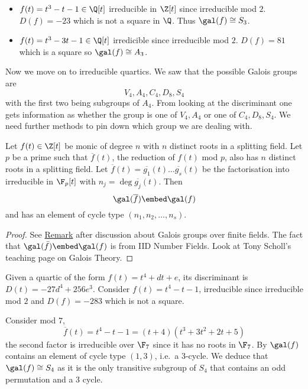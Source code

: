 \documentclass[a4paper]{article}
\newcommand*{\red}[1]{\overline{#1}}
\begin{document}
\begin{eg}\leavevmode
  \begin{itemize}
  \item \(f(t) = t^3 - t - 1 \in \Q[t]\) irreducible in \(\Z[t]\) since irreducible mod \(2\). \(D(f) = -23\) which is not a square in \(\Q\). Thus \(\gal(f) \cong S_3\).
  \item \(f(t) = t^3 - 3t - 1 \in \Q[t]\) irredicible since irreducible mod \(2\). \(D(f) = 81\) which is a square so \(\gal(f) \cong A_3\).
  \end{itemize}
\end{eg}

Now we move on to irreducible quartics. We saw that the possible Galois groups are
\[
  V_4, A_4, C_4, D_8, S_4
\]
with the first two being subgroups of \(A_4\). From looking at the discriminant one gets information as whether the group is one of \(V_4, A_4\) or one of \(C_4, D_8, S_4\). We need further methods to pin down which group we are dealing with.

\begin{theorem}
  \label{thm:mod p reduction}
  Let \(f(t) \in \Z[t]\) be monic of degree \(n\) with \(n\) distinct roots in a splitting field. Let \(p\) be a prime such that \(\red f(t)\), the reduction of \(f(t)\) mod \(p\), also has \(n\) distinct roots in a splitting field. Let \(\red f(t) = \red{g_1}(t) \dots \red{g_s}(t)\) be the factorisation into irreducible in \(\F_p[t]\) with \(n_j =  \deg \red{g_j}(t)\). Then
  \[
    \gal(\red f) \embed \gal(f)
  \]
  and has an element of cycle type \((n_1, n_2, \dots, n_s)\).
\end{theorem}

\begin{proof}
  See \hyperref[rmk:mod p reduction]{Remark} after discussion about Galois groups over finite fields. The fact that \(\gal(\bar f) \embed \gal(f)\) is from IID Number Fields. Look at Tony Scholl's teaching page on Galois Theory.
\end{proof}

\begin{eg}
  Given a quartic of the form \(f(t) = t^4 + dt + e\), its discriminant is \(D(t) = -27d^4 + 256e^3\). Consider \(f(t) = t^4 - t -1\), irreducible since irreducible mod \(2\) and \(D(f) = -283\) which is not a square.

  Consider mod \(7\),
  \[
    \red f(t) = t^4 - t - 1 = (t + 4)(t^3 + 3t^2 + 2t + 5)
  \]
  the second factor is irreducible over \(\F_7\) since it has no roots in \(\F_7\). By  \(\gal(f)\) contains an element of cycle type \((1, 3)\), i.e.\ a \(3\)-cycle. We deduce that \(\gal(f) \cong S_4\) as it is the only transitive subgroup of \(S_4\) that contains an odd permutation and a \(3\) cycle.
\end{eg}
\end{document}
